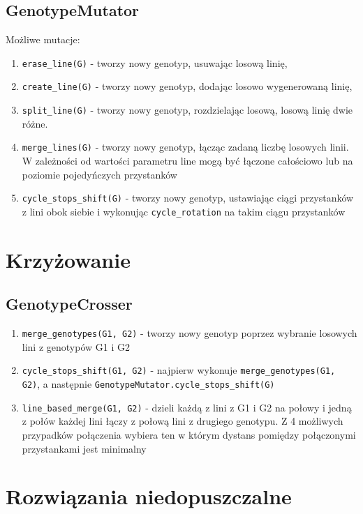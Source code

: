 \documentclass[12pt,a4paper,openright]{mwrep}
\begin{document}
\subsection{GenotypeMutator}

Możliwe mutacje:

\begin{enumerate}
    \item \lstinline{erase_line(G)} - tworzy nowy genotyp, usuwając losową linię,
    \item \lstinline{create_line(G)} - tworzy nowy genotyp, dodając losowo wygenerowaną linię,
    \item \lstinline{split_line(G)} - tworzy nowy genotyp, rozdzielając losową, losową linię dwie różne.
    \item \lstinline{merge_lines(G)} - tworzy nowy genotyp, łącząc zadaną liczbę losowych linii. W zależności od wartości parametru line mogą być łączone całościowo lub na poziomie pojedyńczych przystanków
    \item \lstinline{cycle_stops_shift(G)} - tworzy nowy genotyp, ustawiając ciągi przystanków z lini obok siebie i wykonując \lstinline{cycle_rotation} na takim ciągu przystanków
\end{enumerate}

\section{Krzyżowanie}

\subsection{GenotypeCrosser}

\begin{enumerate}
    \item \lstinline{merge_genotypes(G1, G2)} - tworzy nowy genotyp poprzez wybranie losowych lini z genotypów G1 i G2
    \item \lstinline{cycle_stops_shift(G1, G2)} - najpierw wykonuje \lstinline{merge_genotypes(G1, G2)}, a następnie \lstinline{GenotypeMutator.cycle_stops_shift(G)}
    \item \lstinline{line_based_merge(G1, G2)} - dzieli każdą z lini z G1 i G2 na połowy i jedną z połów każdej lini łączy z połową lini z drugiego genotypu. Z 4 możliwych przypadków połączenia wybiera ten w którym dystans pomiędzy połączonymi przystankami jest minimalny
\end{enumerate}

\section{Rozwiązania niedopuszczalne}
\end{document}
